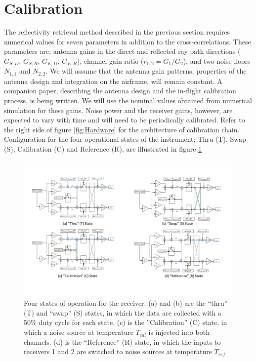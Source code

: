 \documentclass[draftcls,onecolumn]{IEEEtran}  %
\begin{document}
\section{Calibration}
\label{sec:calibration}
The reflectivity retrieval method described in the  previous section requires numerical values for 
seven parameters in addition to the cross-correlations. 
These parameters are;
antenna gains in the direct and reflected ray path directions ($G_{S,D}$, $G_{S,R}$, $G_{E,D}$, $G_{E,R}$),  
channel gain ratio ($r_{1,2} = G_1/G_2$), and  two noise floors $N_{1,1}$ and $N_{2,2}$.
We will assume that the antenna gain patterns, properties of the antenna design and integration on the airframe,  will 
 remain constant. 
A companion paper, describing the antenna design and the in-flight calibration process, is being written.  
We will use the nominal values obtained from numerical simulation for these gains.
 Noise power and the receiver gains, however, are expected to vary with time and will need to be periodically calibrated. 
Refer to the right side of figure \ref{fig:Hardware} for the architecture of calibration chain.
Configuration for the four operational states of the instrument; Thru (T), Swap (S), Calibration (C) and Reference (R), are  
 illustrated in figure \ref{fig:hw_states}
\begin{figure}[h]
	\centering
	\includegraphics[width=\textwidth]{pdf/receiver_states.pdf}
	\caption{Four states of operation for the receiver. (a) and (b) are the ``thru'' (T) and ``swap'' (S) states, in which the data are collected with a 50\% duty cycle for each state. (c) is the ''Calibration'' (C) state, in which a noise source at temperature $T_{cal}$ is injected into both channels. 
    (d) is the ``Reference'' (R) state, in which the inputs to receivers 1 and 2 are switched to noise sources at temperature $T_{ref}$}
	\centering
	\label{fig:hw_states}
\end{figure}
\end{document}
